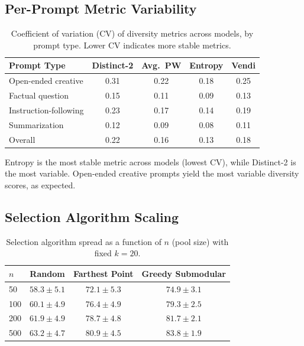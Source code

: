 \documentclass[11pt,a4paper]{article}
\begin{document}
\subsection{Per-Prompt Metric Variability}

\begin{table}[h]
\centering
\caption{Coefficient of variation (CV) of diversity
metrics across models, by prompt type.
Lower CV indicates more stable metrics.}
\label{tab:per_prompt}
\begin{tabular}{@{}lcccc@{}}
\toprule
Prompt Type & Distinct-2 & Avg.\ PW & Entropy & Vendi \\
\midrule
Open-ended creative  & 0.31 & 0.22 & 0.18 & 0.25 \\
Factual question     & 0.15 & 0.11 & 0.09 & 0.13 \\
Instruction-following& 0.23 & 0.17 & 0.14 & 0.19 \\
Summarization        & 0.12 & 0.09 & 0.08 & 0.11 \\
\midrule
Overall              & 0.22 & 0.16 & 0.13 & 0.18 \\
\bottomrule
\end{tabular}
\end{table}

Entropy is the most stable metric across models
(lowest CV), while Distinct-2 is the most variable.
Open-ended creative prompts yield the most variable
diversity scores, as expected.

\subsection{Selection Algorithm Scaling}

\begin{table}[h]
\centering
\caption{Selection algorithm spread as a function of
$n$ (pool size) with fixed $k = 20$.}
\label{tab:selection_scaling}
\begin{tabular}{@{}lccc@{}}
\toprule
$n$ & Random & Farthest Point & Greedy Submodular \\
\midrule
50  & $58.3 \pm 5.1$ & $72.1 \pm 5.3$ & $74.9 \pm 3.1$ \\
100 & $60.1 \pm 4.9$ & $76.4 \pm 4.9$ & $79.3 \pm 2.5$ \\
200 & $61.9 \pm 4.9$ & $78.7 \pm 4.8$ & $81.7 \pm 2.1$ \\
500 & $63.2 \pm 4.7$ & $80.9 \pm 4.5$ & $83.8 \pm 1.9$ \\
\bottomrule
\end{tabular}
\end{table}
\end{document}
